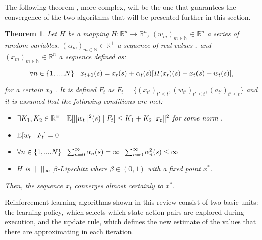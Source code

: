 \documentclass[12pt]{article}
\newtheorem{theorem}{Theorem}[section]
\numberwithin{equation}{section}
\begin{document}
The following theorem \cite{mohri2018foundations}, more complex, will be the one that guarantees  the convergence of the two algorithms that will be presented further  in this section.


\begin{theorem}
   Let $H$ be   a mapping $H: \mathbb{R}^n\longrightarrow \mathbb{R}^n$, $(w_m)_{m\in \mathbb{N}}\in \mathbb{R}^n$ a series of random variables, $(\alpha_m)_{m\in \mathbb{N}}\in \mathbb{R}^+ $ a sequence of real values , and $(x_m)_{m\in \mathbb{N}}\in \mathbb{R}^n$ 
 a sequence defined as:

    $$\forall n \in \{1,....N\}  \hspace{3mm} x_{t+1}(s)=x_t(s)+\alpha_t(s)[H(x_t)(s)-x_t(s) +w_t(s)],$$

   for a certain $x_0$ . It is defined $F_t$ as $F_t=\{(x_{t'})_{t'\leq t},(w_{t'})_{t'\leq t},(a_{t'})_{t' \leq t}\}$ and it is assumed that the following conditions are met:

    \begin{itemize}
        \item $\exists K_1 ,K_2 \in \mathbb{R^n} \hspace{3mm} \mathbb{E}[\lvert \lvert w_t \rvert \rvert^2(s) \hspace{1mm} | \hspace{1mm} F_t] \leq K_1 + K_2\lvert \lvert x_t \rvert \rvert^2$ for some norm .
        \item $\mathbb{E}[ w_t  \hspace{1mm} | \hspace{1mm} F_t]=0$
        \item $\forall n \in \{1,....N\} \hspace{2mm}\sum_{n=0}^{\infty}\alpha_n(s) =\infty 
 \hspace{2mm} \sum_{n=0}^{\infty}\alpha_n^2(s) \leq\infty$
        \item $H$ is  $\lvert \lvert \hspace{2mm} \rvert \rvert_{\infty}$ $\beta$-Lipschitz  where $\beta \in (0,1)$ with a fixed point $x^*$.
    \end{itemize}

   Then, the sequence $x_t$  converges almost certainly to $x^*$.
    
\end{theorem}




 Reinforcement learning algorithms shown in this review consist of two basic units: the learning policy, which selects which state-action pairs are explored during execution, and the update rule, which defines the new estimate of the values that there are approximating in each iteration.
 
\end{document}
